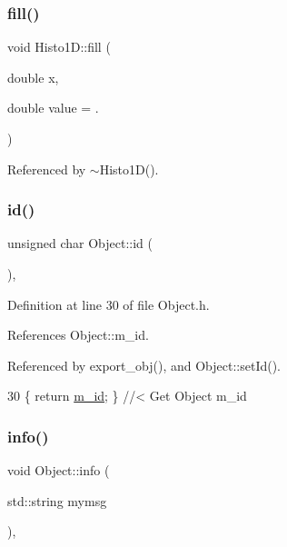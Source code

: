 \subsubsection{\texorpdfstring{fill()}{fill()}}
{\footnotesize\ttfamily void Histo1\+D\+::fill (\begin{DoxyParamCaption}\item[{double}]{x,  }\item[{double}]{value = {.} }\end{DoxyParamCaption})}



Referenced by $\sim$\+Histo1\+D().

\mbox{\label{classObject_af99145335cc61ff6e2798ea17db009d2}} 
\subsubsection{\texorpdfstring{id()}{id()}}
{\footnotesize\ttfamily unsigned char Object\+::id (\begin{DoxyParamCaption}{ }\end{DoxyParamCaption})\hspace{0.3cm}{\ttfamily [inline]}, {\ttfamily [inherited]}}



Definition at line 30 of file Object.\+h.



References Object\+::m\+\_\+id.



Referenced by export\+\_\+obj(), and Object\+::set\+Id().


\begin{DoxyCode}
30 \{ \textcolor{keywordflow}{return} \hyperlink{classObject_aca74b9dbfed7b5556ea2d56c65b6b6b0}{m\_id};         \} \textcolor{comment}{//< Get Object m\_id }
\end{DoxyCode}
\mbox{\label{classObject_a644fd329ea4cb85f54fa6846484b84a8}} 
\subsubsection{\texorpdfstring{info()}{info()}\hspace{0.1cm}{\footnotesize\ttfamily [1/2]}}
{\footnotesize\ttfamily void Object\+::info (\begin{DoxyParamCaption}\item[{std\+::string}]{mymsg }\end{DoxyParamCaption})\hspace{0.3cm}{\ttfamily [inline]}, {\ttfamily [inherited]}}




